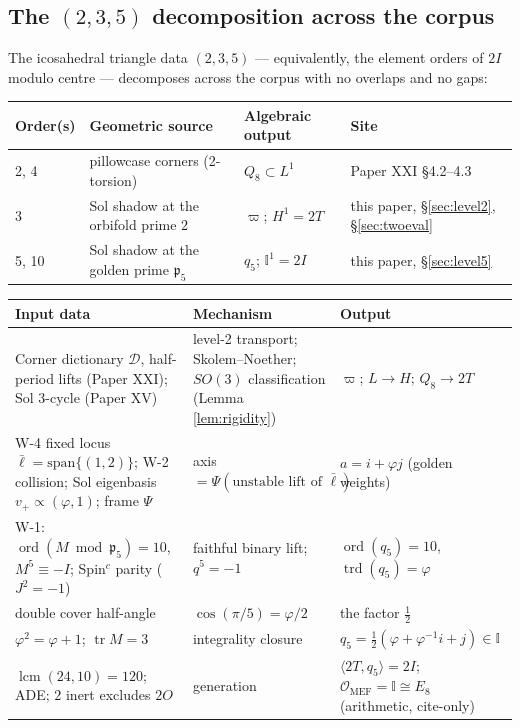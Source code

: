 \documentclass[11pt,a4paper]{article}
\theoremstyle{plain}
\theoremstyle{definition}
\theoremstyle{remark}
\newcommand{\Ico}{\mathbb{I}}
\newcommand{\pfive}{\mathfrak{p}_5}
\newcommand{\OrderMEF}{\mathcal{O}_{\mathrm{MEF}}}
\DeclareMathOperator{\trd}{trd}
\DeclareMathOperator{\ord}{ord}
\begin{document}
\subsection{The $(2,3,5)$ decomposition across the corpus}\label{sec:235}

The icosahedral triangle data $(2,3,5)$ --- equivalently, the element orders of $2I$ modulo centre --- decomposes across the corpus with no overlaps and no gaps:

\begin{center}
\begin{tabular}{@{}llll@{}}
\toprule
\textbf{Order(s)} & \textbf{Geometric source} & \textbf{Algebraic output} & \textbf{Site} \\
\midrule
2, 4 & pillowcase corners (2-torsion) & $Q_8 \subset L^1$ & Paper XXI \S4.2--4.3 \\
3 & Sol shadow at the orbifold prime $2$ & $\varpi$; $H^1 = 2T$ & this paper, \S\ref{sec:level2}, \S\ref{sec:twoeval} \\
5, 10 & Sol shadow at the golden prime $\pfive$ & $q_5$; $\Ico^1 = 2I$ & this paper, \S\ref{sec:level5} \\
\bottomrule
\end{tabular}
\end{center}

\begin{mechanismbox}
\begin{center}
\small
\begin{tabularx}{\textwidth}{@{}>{\raggedright\arraybackslash}X >{\raggedright\arraybackslash}X >{\raggedright\arraybackslash}X@{}}
\toprule
\textbf{Input data} & \textbf{Mechanism} & \textbf{Output} \\
\midrule
Corner dictionary $\mathcal{D}$, half-period lifts (Paper XXI); Sol 3-cycle (Paper XV) & level-2 transport; Skolem--Noether; $SO(3)$ classification (Lemma \ref{lem:rigidity}) & $\varpi$; $L \to H$; $Q_8 \to 2T$ \\
\addlinespace
W-4 fixed locus $\bar\ell = \mathrm{span}\{(1,2)\}$; W-2 collision; Sol eigenbasis $v_+ \propto (\varphi,1)$; frame $\Psi$ & axis $= \Psi(\text{unstable lift of } \bar\ell)$ & $a = i + \varphi j$ (golden weights) \\
\addlinespace
W-1: $\ord(M \bmod \pfive) = 10$, $M^5 \equiv -I$; Spin$^c$ parity ($J^2 = -1$) & faithful binary lift; $q^5 = -1$ & $\ord(q_5) = 10$, $\trd(q_5) = \varphi$ \\
\addlinespace
double cover half-angle & $\cos(\pi/5) = \varphi/2$ & the factor $\tfrac12$ \\
\addlinespace
$\varphi^2 = \varphi + 1$; $\operatorname{tr} M = 3$ & integrality closure & $q_5 = \tfrac12(\varphi + \varphi^{-1}i + j) \in \Ico$ \\
\addlinespace
$\operatorname{lcm}(24,10) = 120$; ADE; $2$ inert excludes $2O$ & generation & $\langle 2T, q_5\rangle = 2I$; $\OrderMEF = \Ico \cong E_8$ (arithmetic, cite-only) \\
\bottomrule
\end{tabularx}
\end{center}
\end{mechanismbox}
\end{document}
